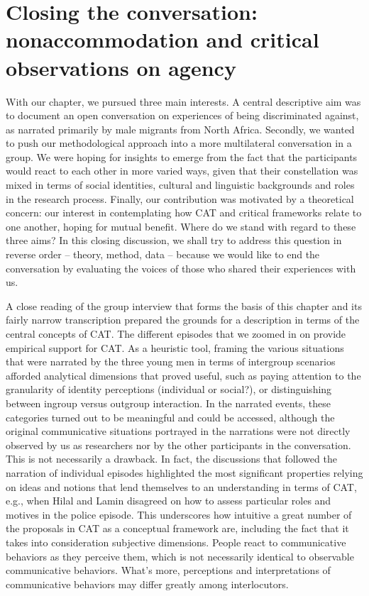 \documentclass[output=paper,colorlinks,citecolor=brown]{langscibook}
\begin{document}
\section{Closing the conversation: nonaccommodation and critical observations on agency}\label{CH1.1.ss.5}

With our chapter, we pursued three main interests. A central descriptive aim was to document an open conversation on experiences of being discriminated against, as narrated primarily by male migrants from North Africa. Secondly, we wanted to push our methodological approach into a more multilateral conversation in a group. We were hoping for insights to emerge from the fact that the participants would react to each other in more varied ways, given that their constellation was mixed in terms of social identities, cultural and linguistic backgrounds and roles in the research process. Finally, our contribution was motivated by a theoretical concern: our interest in contemplating how CAT and critical frameworks relate to one another, hoping for mutual benefit. Where do we stand with regard to these three aims? In this closing discussion, we shall try to address this question in reverse order -- theory, method, data -- because we would like to end the conversation by evaluating the voices of those who shared their experiences with us.

A close reading of the group interview that forms the basis of this chapter and its fairly narrow transcription prepared the grounds for a description in terms of the central concepts of CAT. The different episodes that we zoomed in on provide empirical support for CAT. As a heuristic tool, framing the various situations that were narrated by the three young men in terms of intergroup scenarios afforded analytical dimensions that proved useful, such as paying attention to the granularity of identity perceptions (individual or social?), or distinguishing between ingroup versus outgroup interaction. In the narrated events, these categories turned out to be meaningful and could be accessed, although the original communicative situations portrayed in the narrations were not directly observed by us as researchers nor by the other participants in the conversation. This is not necessarily a drawback. In fact, the discussions that followed the narration of individual episodes highlighted the most significant properties relying on ideas and notions that lend themselves to an understanding in terms of CAT, e.g., when Hilal and Lamin disagreed on how to assess particular roles and motives in the police episode. This underscores how intuitive a great number of the proposals in CAT as a conceptual framework are, including the fact that it takes into consideration subjective dimensions. People react to communicative behaviors as they perceive them, which is not necessarily identical to observable communicative behaviors. What's more, perceptions and interpretations of communicative behaviors may differ greatly among interlocutors.
\end{document}
